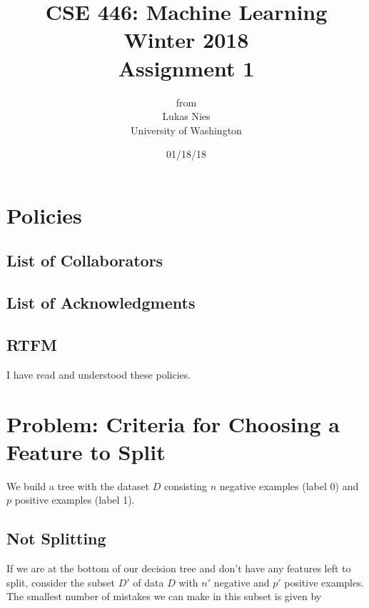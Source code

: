\documentclass[12pt]{article}
\begin{document}
	
	\title{
		\textbf{\huge{CSE 446: Machine Learning Winter 2018 }} \\[2cm]
		\LARGE{Assignment 1}\\[1cm]
	}
	\author{from \\ Lukas Nies \\ University of Washington}
	\date{01/18/18}
	\clearpage\maketitle\thispagestyle{empty}
	\newpage

	\tableofcontents
	\setcounter{page}{0}
	\newpage
	
	\setcounter{section}{-1}
	

\section{Policies}

\subsection{List of Collaborators}

\subsection{List of Acknowledgments}

\subsection{RTFM}

I have read and understood these policies.

\section{Problem: Criteria for Choosing a Feature to Split}

We build a tree with the dataset $D$ consisting $n$ negative examples (label 0) and $p$ positive examples (label 1). 

\subsection{Not Splitting}

If we are at the bottom of our decision tree and don't have any features left to split, consider the subset $D'$ of data $D$ with $n'$ negative and $p'$ positive examples. The smallest number of mistakes we can make in this subset is given by
\end{document}
